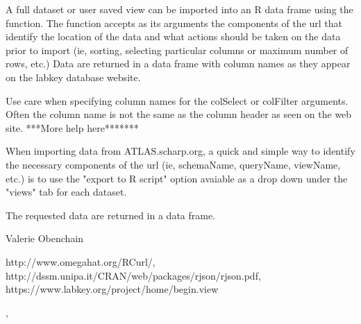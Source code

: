 \documentclass{article}
\begin{document}
\begin{Details}\relax
A full dataset or user saved view can be imported into an R data frame using the  
function. The function accepts as its arguments the components of the url that identify
the location of the data and what actions should be taken on the data prior to import
(ie, sorting, selecting particular columns or maximum number of rows, etc.) Data are returned in a data 
frame with column names as they appear on the labkey database website. 

Use care when specifying column names for the colSelect or colFilter arguments. Often the column name
is not the same as the column header as seen on the web site. ***More help here*******

When importing data from ATLAS.scharp.org, a quick and simple way to identify the necessary components of the url 
(ie, schemaName, queryName, viewName, etc.) is to use the "export to R script" option avaiable as a drop down
under the "views" tab for each dataset.
\end{Details}
\begin{Value}
The requested data are returned in a data frame.
\end{Value}
\begin{Author}\relax
Valerie Obenchain
\end{Author}
\begin{References}\relax
http://www.omegahat.org/RCurl/, 
http://dssm.unipa.it/CRAN/web/packages/rjson/rjson.pdf,
https://www.labkey.org/project/home/begin.view
\end{References}
\begin{SeeAlso}\relax
{}, 
\end{SeeAlso}
\begin{Examples}
\end{Examples}
\end{document}
